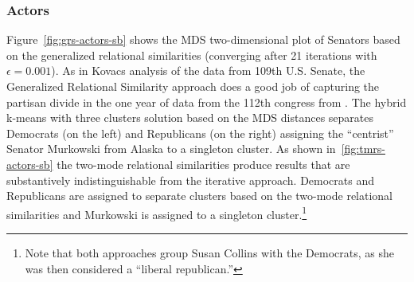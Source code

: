 \documentclass[a4paper,fleqn]{cas-sc}
\begin{document}
\subsubsection{Actors}
Figure~\ref{fig:grs-actors-sb} shows the MDS two-dimensional plot of Senators based on the generalized relational similarities (converging after 21 iterations with $\epsilon = 0.001$). As in Kovacs analysis of the data from 109th U.S. Senate, the Generalized Relational Similarity approach does a good job of capturing the partisan divide in the one year of data from the 112th congress from \citet{knoke2021multimodal}. The hybrid k-means with three clusters solution based on the MDS distances separates Democrats (on the left) and Republicans (on the right) assigning the ``centrist'' Senator Murkowski from Alaska to a singleton cluster. As shown in~\ref{fig:tmrs-actors-sb} the two-mode relational similarities produce results that are substantively indistinguishable from the iterative approach. Democrats and Republicans are assigned to separate clusters based on the two-mode relational similarities and Murkowski is assigned to a singleton cluster.\footnote{Note that both approaches group Susan Collins with the Democrats, as she was then considered a ``liberal republican.''}
\end{document}
